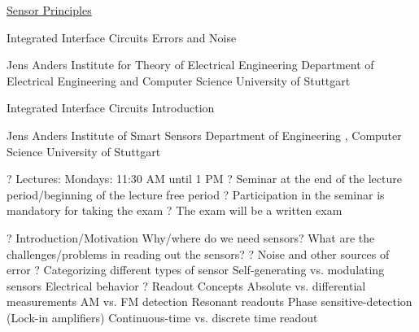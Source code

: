 \documentclass[2pt,landscape]{article}
\begin{document}
	\raggedright
	\footnotesize
	\begin{multicols*}{5}
		
		
		\setlength{\premulticols}{1pt}
		\setlength{\postmulticols}{1pt}
		\setlength{\multicolsep}{1pt}
		\setlength{\columnsep}{2pt}
		
		\begin{center}
			\Large{\underline{Sensor Principles}} \\
			
		\end{center}
		
		







Integrated Interface Circuits \textbullet 
Errors and Noise


Jens Anders
Institute for Theory of Electrical Engineering 
Department of Electrical Engineering and Computer 
Science
University of Stuttgart









Integrated Interface Circuits
\textbullet 
Introduction

Jens Anders
Institute of Smart Sensors
Department of Engineering , Computer Science 
University of Stuttgart



?	Lectures:
\textbullet 	Mondays: 11:30 AM until 1 PM
?	Seminar at the end of the lecture period/beginning of the lecture free
period
?	Participation in the seminar is mandatory for taking the exam
?	The exam will be a written exam



?	Introduction/Motivation
\textbullet 	Why/where do we need sensors?
\textbullet 	What are the challenges/problems in reading out the sensors?
?	Noise and other sources of error
?	Categorizing different types of sensor
\textbullet 	Self-generating vs. modulating sensors
\textbullet 	Electrical behavior
?	Readout Concepts
\textbullet 	Absolute vs. differential measurements
\textbullet 	AM vs. FM detection
\textbullet 	Resonant readouts
\textbullet 	Phase sensitive-detection (Lock-in amplifiers)
\textbullet 	Continuous-time vs. discrete time readout




\end{multicols*}
\end{document}
